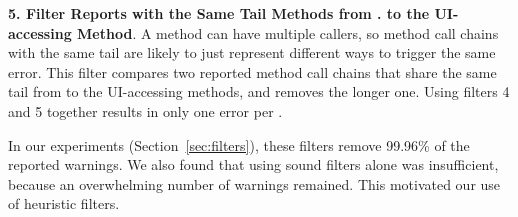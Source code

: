 \textbf{5. Filter Reports with the Same Tail Methods from .
to the UI-accessing Method}. A method
can have multiple callers, so method call chains with the same tail are likely
to just represent different ways to trigger the same error. This filter compares 
two reported method call chains that share the same 
tail from  to the UI-accessing methods, and
removes the longer one. Using filters 4 and 5 together results in
only one error per .



\vspace{1mm}

In our experiments (Section~\ref{sec:filters}), these filters remove
99.96\% of the reported warnings.
We also found that using sound filters alone was insufficient, because an overwhelming
number of warnings remained.  This motivated our use
of heuristic filters.




